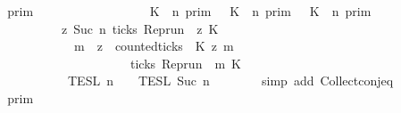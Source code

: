 \begin{isabellebody}
\ \ \isamarkupfalse%
\ \isamarkupfalse%
\ {\isacartoucheopen}{\isachardot}{\isachardot}{\isachardot}\ {\isacharequal}\ {\isasymlbrakk}{\isasymlbrakk}\ {\isasymGamma}\ {\isasymrbrakk}{\isasymrbrakk}\isactrlsub p\isactrlsub r\isactrlsub i\isactrlsub m\isanewline
\ \ \ \ \ \ \ \ \ \ \ \ \ \ \ \ {\isasyminter}\ {\isacharparenleft}{\isasymlbrakk}\ K\ {\isasymnot}{\isasymUp}\ n\ {\isasymrbrakk}\isactrlsub p\isactrlsub r\isactrlsub i\isactrlsub m\ {\isasymunion}\ {\isacharparenleft}{\isasymlbrakk}\ K\ {\isasymUp}\ n\ {\isasymrbrakk}\isactrlsub p\isactrlsub r\isactrlsub i\isactrlsub m\ {\isasyminter}\ {\isasymlbrakk}\ K\ {\isasymUp}\ n\ {\isasymrbrakk}\isactrlsub p\isactrlsub r\isactrlsub i\isactrlsub m{\isacharparenright}{\isacharparenright}\isanewline
\ \ \ \ \ \ \ \ \ \ \ \ \ \ \ \ {\isasyminter}\ {\isacharbraceleft}{\isasymrho}{\isachardot}\ {\isasymforall}z{\isasymge}\ Suc\ n{\isachardot}\ ticks\ {\isacharparenleft}{\isacharparenleft}Rep{\isacharunderscore}run\ {\isasymrho}{\isacharparenright}\ z\ K\ {\isasymlongrightarrow}\isanewline
\ \ \ \ \ \ \ \ \ \ \ \ \ \ \ \ \ \ \ \ {\isacharparenleft}{\isasymforall}m\ {\isasymge}\ z{\isachardot}\ \ counted{\isacharunderscore}ticks\ {\isasymrho}\ K\ z\ m\ {}\isanewline
\ \ \ \ \ \ \ \ \ \ \ \ \ \ \ \ \ \ \ \ \ \ \ \ \ \ \ \ {\isasymlongrightarrow}\ ticks\ {\isacharparenleft}{\isacharparenleft}Rep{\isacharunderscore}run\ {\isasymrho}{\isacharparenright}\ m\ K\ {\isacharbraceright}\isanewline
\ \ \ \ \ \ \ \ \ \ \ \ \ \ \ \ {\isasyminter}\ {\isasymlbrakk}{\isasymlbrakk}\ {\isasymPsi}\ {\isasymrbrakk}{\isasymrbrakk}\isactrlsub T\isactrlsub E\isactrlsub S\isactrlsub L\isactrlbsup {\isasymge}\ n\isactrlesup \ {\isasyminter}\ {\isasymlbrakk}{\isasymlbrakk}\ {\isasymPhi}\ {\isasymrbrakk}{\isasymrbrakk}\isactrlsub T\isactrlsub E\isactrlsub S\isactrlsub L\isactrlbsup {\isasymge}\ Suc\ n\isactrlesup {\isacartoucheclose}\isanewline
\ \ \ \ \ \ \isamarkupfalse%
\ {\isacharparenleft}simp\ add{\isacharcolon}\ Collect{\isacharunderscore}conj{\isacharunderscore}eq{\isacharparenright}\isanewline
\ \ \isamarkupfalse%
\ \isamarkupfalse%
\ {\isacartoucheopen}{\isachardot}{\isachardot}{\isachardot}\ {\isacharequal}\ {\isasymlbrakk}{\isasymlbrakk}\ {\isasymGamma}\ {\isasymrbrakk}{\isasymrbrakk}\isactrlsub p\isactrlsub r\isactrlsub i\isactrlsub m\isanewline

\end{isabellebody}
